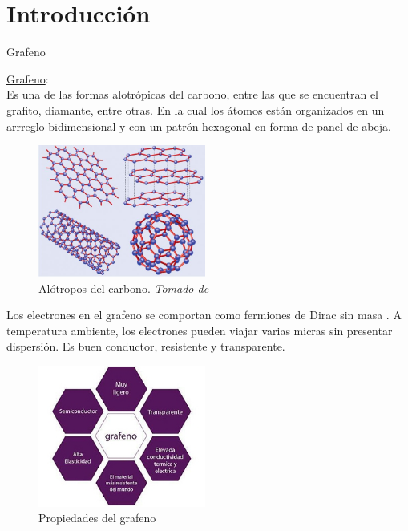 \section{Introducción}
			
\begin{frame}{Grafeno}
	\justifying
	\begin{multicols}{2}

		\underline{Grafeno}:\\ 
		Es una de las formas alotrópicas del carbono, entre las que se encuentran el grafito, diamante, entre otras. En la cual los átomos están organizados en un arrreglo bidimensional y con un patrón hexagonal en forma de panel de abeja.

		\begin{figure}
		\includegraphics[width=5.5cm]{graficas/alotropo.jpg}
		\caption{ Alótropos del carbono. \textit{Tomado de }\cite{Neto2006}} 
		\label{grafeno}
		\end{figure}
	\end{multicols}
\end{frame}

\begin{frame}
	\begin{multicols}{2}
		Los electrones en el grafeno se comportan como fermiones de Dirac sin masa \cite{Katsnelson2007}. A temperatura ambiente, los electrones pueden viajar varias micras sin presentar dispersión. Es buen conductor, resistente y transparente.
		\begin{figure}
			\includegraphics[width=5.5cm]{graficas/propiedadesGrafeno.jpg}
			\caption{Propiedades del grafeno}
		\end{figure}
		\end{multicols}
\end{frame}

